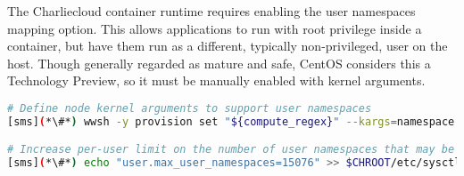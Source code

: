 The Charliecloud container runtime requires enabling the user namespaces mapping
option. This allows applications to run with root privilege inside a container, 
but have them run as a different, typically non-privileged, user on the host.
Though generally regarded as mature and safe, CentOS considers this a Technology
Preview, so it must be manually enabled with kernel arguments.

\begin{lstlisting}[language=bash,keywords={},upquote=true]
# Define node kernel arguments to support user namespaces
[sms](*\#*) wwsh -y provision set "${compute_regex}" --kargs=namespace.unpriv_enable=1

# Increase per-user limit on the number of user namespaces that may be created
[sms](*\#*) echo "user.max_user_namespaces=15076" >> $CHROOT/etc/sysctl.conf
\end{lstlisting}
